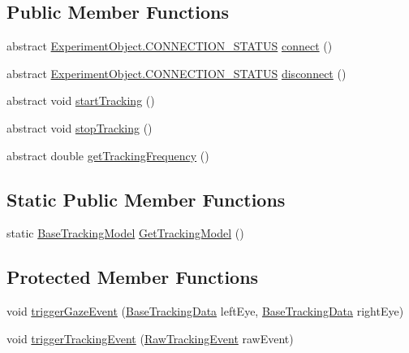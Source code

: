\subsection*{Public Member Functions}
\begin{DoxyCompactItemize}
\item 
abstract \hyperlink{class_web_analyzer_1_1_u_i_1_1_interaction_objects_1_1_experiment_object_a2875208b4f4b0ed643593152f4ec025c}{Experiment\+Object.\+C\+O\+N\+N\+E\+C\+T\+I\+O\+N\+\_\+\+S\+T\+A\+T\+U\+S} \hyperlink{class_web_analyzer_1_1_models_1_1_base_1_1_base_tracking_model_ae9cca2b18274747b70b51f0d1cc37532}{connect} ()
\item 
abstract \hyperlink{class_web_analyzer_1_1_u_i_1_1_interaction_objects_1_1_experiment_object_a2875208b4f4b0ed643593152f4ec025c}{Experiment\+Object.\+C\+O\+N\+N\+E\+C\+T\+I\+O\+N\+\_\+\+S\+T\+A\+T\+U\+S} \hyperlink{class_web_analyzer_1_1_models_1_1_base_1_1_base_tracking_model_a1540c4d92ded2ce32aa485eafd9e3a12}{disconnect} ()
\item 
abstract void \hyperlink{class_web_analyzer_1_1_models_1_1_base_1_1_base_tracking_model_a772a6b05f3976114c432d746510c3ceb}{start\+Tracking} ()
\item 
abstract void \hyperlink{class_web_analyzer_1_1_models_1_1_base_1_1_base_tracking_model_a22286c5202de039794f020d3fed12ae1}{stop\+Tracking} ()
\item 
abstract double \hyperlink{class_web_analyzer_1_1_models_1_1_base_1_1_base_tracking_model_ab79ef77eec8b92c3c7e536e25642af56}{get\+Tracking\+Frequency} ()
\end{DoxyCompactItemize}
\subsection*{Static Public Member Functions}
\begin{DoxyCompactItemize}
\item 
static \hyperlink{class_web_analyzer_1_1_models_1_1_base_1_1_base_tracking_model}{Base\+Tracking\+Model} \hyperlink{class_web_analyzer_1_1_models_1_1_base_1_1_base_tracking_model_ae86fbecc03c9d2a2813b684ee2f2c8ee}{Get\+Tracking\+Model} ()
\end{DoxyCompactItemize}
\subsection*{Protected Member Functions}
\begin{DoxyCompactItemize}
\item 
void \hyperlink{class_web_analyzer_1_1_models_1_1_base_1_1_base_tracking_model_a841c667811d9923a91ca7837f72f8f19}{trigger\+Gaze\+Event} (\hyperlink{class_web_analyzer_1_1_models_1_1_base_1_1_base_tracking_data}{Base\+Tracking\+Data} left\+Eye, \hyperlink{class_web_analyzer_1_1_models_1_1_base_1_1_base_tracking_data}{Base\+Tracking\+Data} right\+Eye)
\item 
void \hyperlink{class_web_analyzer_1_1_models_1_1_base_1_1_base_tracking_model_a497edbc82520c1c9582d2747baa6312f}{trigger\+Tracking\+Event} (\hyperlink{class_web_analyzer_1_1_models_1_1_base_1_1_raw_tracking_event}{Raw\+Tracking\+Event} raw\+Event)
\end{DoxyCompactItemize}

